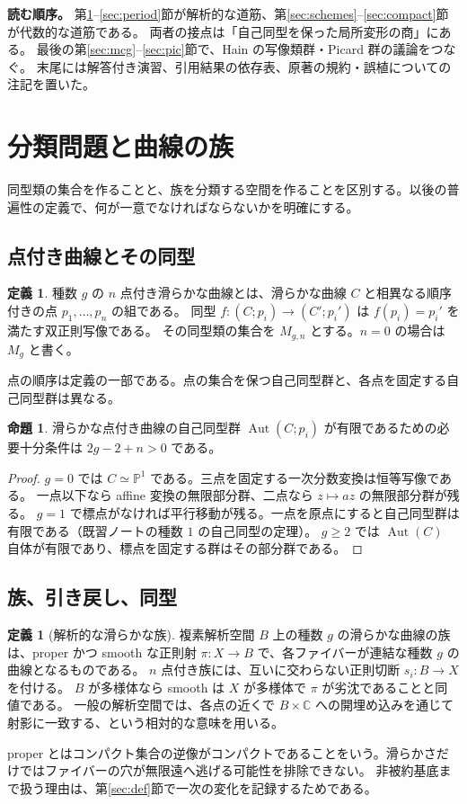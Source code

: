 \documentclass[dvipdfmx,a4paper,11pt]{article}
\theoremstyle{definition}
\newtheorem{prop}[thm]{命題}
\newtheorem{dfn}[thm]{定義}
\newenvironment{aim}{\begin{tcolorbox}[mybox,colback=green!3,title=この章で考えること,fonttitle=\bfseries]}{\end{tcolorbox}}
\newcommand{\C}{\mathbb C}\newcommand{\R}{\mathbb R}\newcommand{\Z}{\mathbb Z}\newcommand{\Q}{\mathbb Q}
\newcommand{\PP}{\mathbb P}\newcommand{\HH}{\mathbb H}
\DeclareMathOperator{\Aut}{Aut}\DeclareMathOperator{\Pic}{Pic}\DeclareMathOperator{\Hom}{Hom}
\begin{document}
\textbf{読む順序。}
第\ref{sec:families}--\ref{sec:period}節が解析的な道筋、第\ref{sec:schemes}--\ref{sec:compact}節が代数的な道筋である。
両者の接点は「自己同型を保った局所変形の商」にある。
最後の第\ref{sec:mcg}--\ref{sec:pic}節で、Hain の写像類群・Picard 群の議論をつなぐ。
末尾には解答付き演習、引用結果の依存表、原著の規約・誤植についての注記を置いた。
\clearpage
\tableofcontents
\clearpage

\section{分類問題と曲線の族}\label{sec:families}
\begin{aim}
同型類の集合を作ることと、族を分類する空間を作ることを区別する。以後の普遍性の定義で、何が一意でなければならないかを明確にする。
\end{aim}
\subsection{点付き曲線とその同型}
\begin{dfn}
種数 $g$ の $n$ 点付き滑らかな曲線とは、滑らかな曲線 $C$ と相異なる順序付きの点 $p_1,\ldots,p_n$ の組である。
同型 $f:(C;p_i)\to(C';p_i')$ は $f(p_i)=p_i'$ を満たす双正則写像である。
その同型類の集合を $M_{g,n}$ とする。$n=0$ の場合は $M_g$ と書く。
\end{dfn}
点の順序は定義の一部である。点の集合を保つ自己同型群と、各点を固定する自己同型群は異なる。
\begin{prop}\label{prop:finiteaut}
滑らかな点付き曲線の自己同型群 $\Aut(C;p_i)$ が有限であるための必要十分条件は $2g-2+n>0$ である。
\end{prop}
\begin{proof}
$g=0$ では $C\simeq\PP^1$ である。三点を固定する一次分数変換は恒等写像である。
一点以下なら affine 変換の無限部分群、二点なら $z\mapsto az$ の無限部分群が残る。
$g=1$ で標点がなければ平行移動が残る。一点を原点にすると自己同型群は有限である（既習ノートの種数 $1$ の自己同型の定理）。
$g\ge2$ では $\Aut(C)$ 自体が有限であり、標点を固定する群はその部分群である。
\end{proof}
\subsection{族、引き戻し、同型}
\begin{dfn}[解析的な滑らかな族]\label{def:family}
複素解析空間 $B$ 上の種数 $g$ の滑らかな曲線の族は、proper かつ smooth な正則射 $\pi:X\to B$ で、各ファイバーが連結な種数 $g$ の曲線となるものである。
$n$ 点付き族には、互いに交わらない正則切断 $s_i:B\to X$ を付ける。
$B$ が多様体なら smooth は $X$ が多様体で $\pi$ が劣沈であることと同値である。
一般の解析空間では、各点の近くで $B\times\C$ への開埋め込みを通じて射影に一致する、という相対的な意味を用いる。
\end{dfn}
proper とはコンパクト集合の逆像がコンパクトであることをいう。滑らかさだけではファイバーの穴が無限遠へ逃げる可能性を排除できない。
非被約基底まで扱う理由は、第\ref{sec:def}節で一次の変化を記録するためである。
\end{document}
